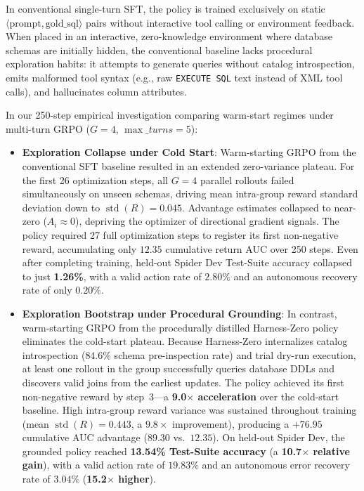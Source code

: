 \documentclass{article}
\theoremstyle{plain}
\theoremstyle{definition}
\theoremstyle{remark}
\begin{document}
In conventional single-turn SFT, the policy is trained exclusively on static $\langle \text{prompt}, \text{gold\_sql} \rangle$ pairs without interactive tool calling or environment feedback. When placed in an interactive, zero-knowledge environment where database schemas are initially hidden, the conventional baseline lacks procedural exploration habits: it attempts to generate queries without catalog introspection, emits malformed tool syntax (e.g., raw \texttt{EXECUTE SQL} text instead of XML tool calls), and hallucinates column attributes. 

In our 250-step empirical investigation comparing warm-start regimes under multi-turn GRPO ($G=4$, $\max\_turns=5$):
\begin{itemize}[leftmargin=*,itemsep=2pt]
    \item \textbf{Exploration Collapse under Cold Start}: Warm-starting GRPO from the conventional SFT baseline resulted in an extended zero-variance plateau. For the first 26 optimization steps, all $G=4$ parallel rollouts failed simultaneously on unseen schemas, driving mean intra-group reward standard deviation down to $\operatorname{std}(R) = 0.045$. Advantage estimates collapsed to near-zero ($A_i \approx 0$), depriving the optimizer of directional gradient signals. The policy required 27 full optimization steps to register its first non-negative reward, accumulating only $12.35$ cumulative return AUC over 250 steps. Even after completing training, held-out Spider Dev Test-Suite accuracy collapsed to just \textbf{1.26\%}, with a valid action rate of $2.80\%$ and an autonomous recovery rate of only $0.20\%$.
    \item \textbf{Exploration Bootstrap under Procedural Grounding}: In contrast, warm-starting GRPO from the procedurally distilled Harness-Zero policy eliminates the cold-start plateau. Because Harness-Zero internalizes catalog introspection ($84.6\%$ schema pre-inspection rate) and trial dry-run execution, at least one rollout in the group successfully queries database DDLs and discovers valid joins from the earliest updates. The policy achieved its first non-negative reward by step~3---a \textbf{9.0$\times$ acceleration} over the cold-start baseline. High intra-group reward variance was sustained throughout training (mean $\operatorname{std}(R) = 0.443$, a $9.8\times$ improvement), producing a $+76.95$ cumulative AUC advantage ($89.30$ vs.\ $12.35$). On held-out Spider Dev, the grounded policy reached \textbf{13.54\% Test-Suite accuracy} (a \textbf{10.7$\times$ relative gain}), with a valid action rate of $19.83\%$ and an autonomous error recovery rate of $3.04\%$ (\textbf{15.2$\times$ higher}).
\end{itemize}
\end{document}
